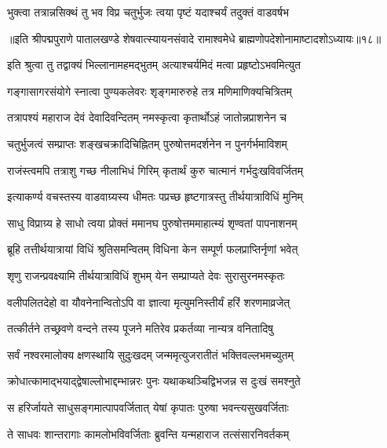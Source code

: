 \twolineshloka
{भुक्त्वा तत्रान्नसिक्थं तु भव विप्र चतुर्भुजः}
{त्वया पृष्टं यदाश्चर्यं तदुक्तं वाडवर्षभ}%

॥इति श्रीपद्मपुराणे पातालखण्डे शेषवात्स्यायनसंवादे रामाश्वमेधे ब्राह्मणोपदेशोनामाष्टादशोऽध्यायः॥१८॥



\twolineshloka
{इति श्रुत्वा तु तद्वाक्यं भिल्लानामहमद्भुतम्}
{अत्याश्चर्यमिदं मत्वा प्रहृष्टोऽभवमित्युत}%

\twolineshloka
{गङ्गासागरसंयोगे स्नात्वा पुण्यकलेवरः}
{शृङ्गमारुरुहे तत्र मणिमाणिक्यचित्रितम्}%

\twolineshloka
{तत्रापश्यं महाराज देवं देवादिवन्दितम्}
{नमस्कृत्वा कृतार्थोऽहं जातोन्नप्राशनेन च}%

\twolineshloka
{चतुर्भुजत्वं सम्प्राप्तः शङ्खचक्रादिचिह्नितम्}
{पुरुषोत्तमदर्शनेन न पुनर्गर्भमाविशम्}%

\twolineshloka
{राजंस्त्वमपि तत्राशु गच्छ नीलाभिधं गिरिम्}
{कृतार्थं कुरु चात्मानं गर्भदुःखविवर्जितम्}%

\twolineshloka
{इत्याकर्ण्य वचस्तस्य वाडवाग्र्यस्य धीमतः}
{पप्रच्छ हृष्टगात्रस्तु तीर्थयात्राविधिं मुनिम्}%


\twolineshloka
{साधु विप्राग्र्य हे साधो त्वया प्रोक्तं ममानघ}
{पुरुषोत्तममाहात्म्यं शृण्वतां पापनाशनम्}%

\twolineshloka
{ब्रूहि तत्तीर्थयात्रायां विधिं श्रुतिसमन्वितम्}
{विधिना केन सम्पूर्ण फलप्राप्तिर्नृणां भवेत्}%


\twolineshloka
{शृणु राजन्प्रवक्ष्यामि तीर्थयात्राविधिं शुभम्}
{येन सम्प्राप्यते देवः सुरासुरनमस्कृतः}%

\twolineshloka
{वलीपलितदेहो वा यौवनेनान्वितोऽपि वा}
{ज्ञात्वा मृत्युमनिस्तीर्यं हरिं शरणमाव्रजेत्}%

\twolineshloka
{तत्कीर्तने तच्छ्रवणे वन्दने तस्य पूजने}
{मतिरेव प्रकर्तव्या नान्यत्र वनितादिषु}%

\twolineshloka
{सर्वं नश्वरमालोक्य क्षणस्थायि सुदुःखदम्}
{जन्ममृत्युजरातीतं भक्तिवल्लभमच्युतम्}%

\twolineshloka
{क्रोधात्कामाद्भयाद्द्वेषाल्लोभाद्दम्भान्नरः पुनः}
{यथाकथञ्चिद्विभजन्न स दुःखं समश्नुते}%

\twolineshloka
{स हरिर्जायते साधुसङ्गमात्पापवर्जितात्}
{येषां कृपातः पुरुषा भवन्त्यसुखवर्जिताः}%

\twolineshloka
{ते साधवः शान्तरागाः कामलोभविवर्जिताः}
{ब्रुवन्ति यन्महाराज तत्संसारनिवर्तकम्}%

